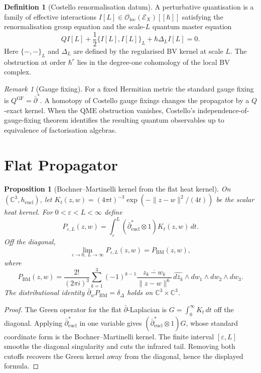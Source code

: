 \documentclass[11pt]{amsart}
\providecommand{\C}{\mathbb{C}}
\providecommand{\dbar}{\bar{\partial}}
\providecommand{\dbarstar}{\bar{\partial}^{\ast}}
\providecommand{\cE}{\mathcal{E}}
\providecommand{\cO}{\mathcal{O}}
\theoremstyle{plain}
\newtheorem{proposition}[theorem]{Proposition}
\theoremstyle{definition}
\newtheorem{definition}[theorem]{Definition}
\theoremstyle{remark}
\newtheorem{remark}[theorem]{Remark}
\begin{document}
\begin{definition}[Costello renormalisation datum]
\label{def:costello-rg}
A perturbative quantisation is a family of effective interactions
$I[L]\in\cO_{\mathrm{loc}}(\cE_X)[[\hbar]]$ satisfying the renormalisation
group equation and the scale-$L$ quantum master equation
\[
  QI[L]+\frac12\{I[L],I[L]\}_L+\hbar\Delta_L I[L]=0.
\]
Here $\{-,-\}_L$ and $\Delta_L$ are defined by the regularised BV kernel
at scale $L$. The obstruction at order $\hbar^r$ lies in the degree-one
cohomology of the local BV complex.
\end{definition}

\begin{remark}[Gauge fixing]
\label{rem:gauge-fixing}
For a fixed Hermitian metric the standard gauge fixing is
$Q^{\mathrm{GF}}=\dbarstar$. A homotopy of Costello gauge fixings changes
the propagator by a $Q$-exact kernel. When the QME obstruction vanishes,
Costello's independence-of-gauge-fixing theorem identifies the resulting
quantum observables up to equivalence of factorisation algebras.
\end{remark}

\section{Flat Propagator}
\label{sec:flat-propagator}

\begin{proposition}[Bochner--Martinelli kernel from the flat heat kernel]
\label{prop:bm-kernel}
On $(\C^3,h_{\mathrm{eucl}})$, let
$K_t(z,w)=(4\pi t)^{-3}\exp(-\|z-w\|^2/(4t))$ be the scalar heat kernel.
For $0<\varepsilon<L<\infty$ define
\[
  P_{\varepsilon,L}(z,w)=
  \int_{\varepsilon}^{L}(\dbarstar_{\mathrm{eucl}}\otimes 1)K_t(z,w)\,dt .
\]
Off the diagonal,
\[
  \lim_{\varepsilon\to0,\;L\to\infty}P_{\varepsilon,L}(z,w)
  =P_{\mathrm{BM}}(z,w),
\]
where
\[
P_{\mathrm{BM}}(z,w)=
\frac{2!}{(2\pi i)^3}
\sum_{k=1}^{3}(-1)^{k-1}
\frac{\overline{z_k-w_k}}{\|z-w\|^6}\,
\widehat{d\bar z_k}\wedge dw_1\wedge dw_2\wedge dw_3 .
\]
The distributional identity
$\dbar_wP_{\mathrm{BM}}=\delta_{\Delta}$ holds on
$\C^3\times\C^3$.
\end{proposition}

\begin{proof}
The Green operator for the flat $\dbar$-Laplacian is
$G=\int_0^\infty K_t\,dt$ off the diagonal. Applying
$\dbarstar_{\mathrm{eucl}}$ in one variable gives
$(\dbarstar_{\mathrm{eucl}}\otimes1)G$, whose standard coordinate form
is the Bochner--Martinelli kernel. The finite interval
$[\varepsilon,L]$ smooths the diagonal singularity and cuts the infrared
tail. Removing both cutoffs recovers the Green kernel away from the
diagonal, hence the displayed formula.
\end{proof}
\end{document}
